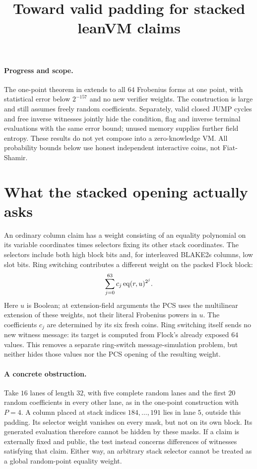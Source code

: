 \documentclass[11pt]{article}
\title{Toward valid padding for stacked leanVM claims}
\author{}
\date{}
\begin{document}
\maketitle
\vspace{-2em}

\paragraph{Progress and scope.} The one-point theorem in  extends to all $64$ Frobenius forms at one point, with statistical error below $2^{-157}$ and no new verifier weights. The construction is large and still assumes freely random coefficients. Separately, valid closed JUMP cycles and free inverse witnesses jointly hide the condition, flag and inverse terminal evaluations with the same error bound; unused memory supplies further field entropy. These results do not yet compose into a zero-knowledge VM. All probability bounds below use honest independent interactive coins, not Fiat-Shamir.

\section{What the stacked opening actually asks}

An ordinary column claim has a weight consisting of an equality polynomial on its variable coordinates times selectors fixing its other stack coordinates. The selectors include both high block bits and, for interleaved BLAKE2s columns, low slot bits. Ring switching contributes a different weight on the packed Flock block:
\[
 \sum_{j=0}^{63} c_j\operatorname{eq}(r,u)^{2^j}.
\]
Here $u$ is Boolean; at extension-field arguments the PCS uses the multilinear extension of these weights, not their literal Frobenius powers in $u$. The coefficients $c_j$ are determined by its six fresh coins. Ring switching itself sends no new witness message: its target is computed from Flock's already exposed $64$ values. This removes a separate ring-switch message-simulation problem, but neither hides those values nor the PCS opening of the resulting weight.

\paragraph{A concrete obstruction.} Take $16$ lanes of length $32$, with five complete random lanes and the first $20$ random coefficients in every other lane, as in the one-point construction with $P=4$. A column placed at stack indices $184,\ldots,191$ lies in lane $5$, outside this padding. Its selector weight vanishes on every mask, but not on its own block. Its generated evaluation therefore cannot be hidden by these masks. If a claim is externally fixed and public, the test instead concerns differences of witnesses satisfying that claim. Either way, an arbitrary stack selector cannot be treated as a global random-point equality weight.
\end{document}
